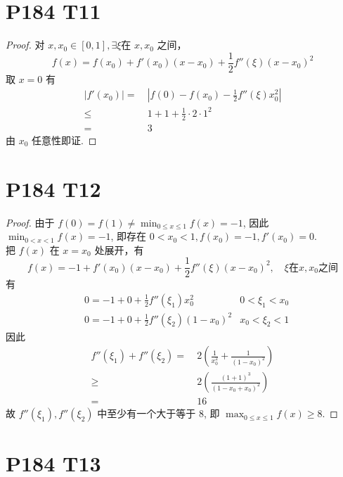 \documentclass{article}
\begin{document}
\section*{P184 T11}

\begin{proof}
    对 $x, x_0 \in [0, 1], \exists \xi$在 $x, x_0$ 之间，
    $$f(x) = f(x_0) + f'(x_0)(x - x_0) + \frac{1}{2}f''(\xi)(x - x_0)^2 $$
    取 $x = 0$ 有
    \begin{align*}
        \left\lvert f'(x_0)\right\rvert  =\ &
        \left\lvert f(0) - f(x_0) - \frac{1}{2}f''(\xi)x_0^2\right\rvert  \\
        \leqslant \ & 1 + 1 + \frac{1}{2}\cdot 2 \cdot 1^2 \\
        =\ & 3
    \end{align*} 
    由 $x_0$ 任意性即证.
\end{proof}

\section*{P184 T12}

\begin{proof}
    由于 $f(0) = f(1) \neq \min_{0 \leqslant x \leqslant 1}f(x) = -1$, 因此 $\min_{0 < x < 1}f(x) = -1$, 即存在 $0 < x_0 < 1, f(x_0) = -1, f'(x_0) = 0$. \\
    把 $f(x)$ 在 $x = x_0$ 处展开，有
    \[
        f(x) = -1 + f'(x_0)(x - x_0) + \frac{1}{2}f''(\xi)(x - x_0)^2, \quad \xi \text{在} x, x_0 \text{之间}
    \]
    有 
    \begin{align*}
        & 0 = -1 + 0 + \frac{1}{2}f''(\xi_1)x_0^2 &  0 < \xi_1 < x_0\\
        & 0 = -1 + 0 + \frac{1}{2}f''(\xi_2)(1 - x_0)^2 &  x_0 < \xi_2 < 1
    \end{align*}
    因此
    \begin{align*}
        f''(\xi_1) + f''(\xi_2) =\  & 2\left(\frac{1}{x_0^2} + \frac{1}{(1 - x_0)^2}\right) \\
        \geqslant \ & 2\left(\frac{(1 + 1)^3}{(1 - x_0 + x_0)^2}\right)\\
        = \ & 16
    \end{align*}
    故 $f''(\xi_1), f''(\xi_2)$ 中至少有一个大于等于 $8$, 即 $\max_{0 \leqslant x \leqslant 1}f(x) \geqslant 8$.
\end{proof}

\section*{P184 T13}
\end{document}
